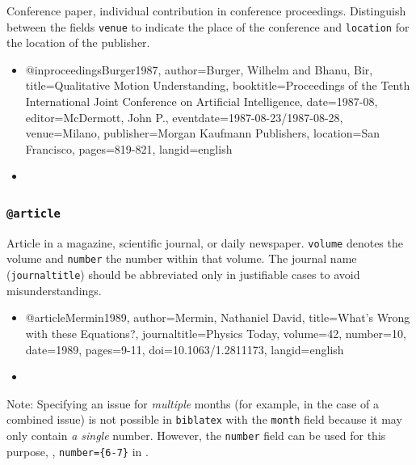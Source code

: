 Conference paper, individual contribution in conference proceedings. Distinguish
between the fields \texttt{venue} to indicate the place of the conference and
\texttt{location} for the location of the publisher.
%
\begin{itemize}
\item[]
\begin{GenericCode}[numbers=none]
@inproceedings{Burger1987,
  author={Burger, Wilhelm and Bhanu, Bir},
  title={Qualitative Motion Understanding},
  booktitle={Proceedings of the Tenth International Joint Conference on Artificial Intelligence},
  date={1987-08},
  editor={McDermott, John P.},
  eventdate={1987-08-23/1987-08-28},
  venue={Milano},
  publisher={Morgan Kaufmann Publishers},
  location={San Francisco},
  pages={819-821},
  langid={english}
}
\end{GenericCode}
\item[\cite{Burger1987}] 
\end{itemize}


\subsubsection{\texttt{\bfseries @article}}
\label{sec:@article}

Article in a magazine, scientific journal, or daily newspaper. \texttt{volume}
denotes the volume and \texttt{number} the number within that volume. The
journal name (\texttt{journaltitle}) should be abbreviated only in justifiable
cases to avoid misunderstandings.
%
\begin{itemize}
\item[]
\begin{GenericCode}[numbers=none]
@article{Mermin1989,
  author={Mermin, Nathaniel David},
  title={What's Wrong with these Equations?},
  journaltitle={Physics Today},
  volume={42},
  number={10},
  date={1989},
  pages={9-11},
  doi={10.1063/1.2811173},
  langid={english}
}
\end{GenericCode}
\item[\cite{Mermin1989}] 
\end{itemize}
%
Note: Specifying an issue for \emph{multiple} months (for example, in the
case of a combined issue) is not possible in \texttt{biblatex} with the
\texttt{month} field because it may only contain \emph{a single} number.
However, the \texttt{number} field can be used for this purpose, \eg,
\texttt{number=\{6-7\}} in \cite{Vardavoulia2001}.

